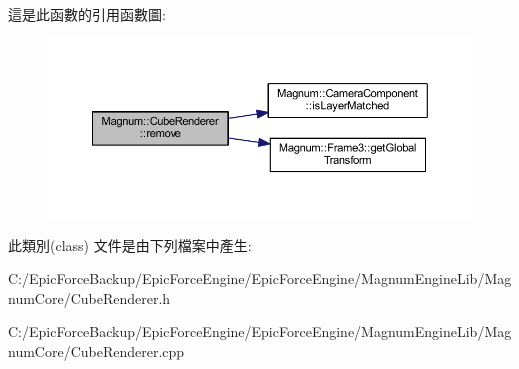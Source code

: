 這是此函數的引用函數圖\+:\nopagebreak
\begin{figure}[H]
\begin{center}
\leavevmode
\includegraphics[width=350pt]{class_magnum_1_1_cube_renderer_a0ee1e417798a21ad7276c90d327226ed_cgraph}
\end{center}
\end{figure}




此類別(class) 文件是由下列檔案中產生\+:\begin{DoxyCompactItemize}
\item 
C\+:/\+Epic\+Force\+Backup/\+Epic\+Force\+Engine/\+Epic\+Force\+Engine/\+Magnum\+Engine\+Lib/\+Magnum\+Core/Cube\+Renderer.\+h\item 
C\+:/\+Epic\+Force\+Backup/\+Epic\+Force\+Engine/\+Epic\+Force\+Engine/\+Magnum\+Engine\+Lib/\+Magnum\+Core/Cube\+Renderer.\+cpp\end{DoxyCompactItemize}
